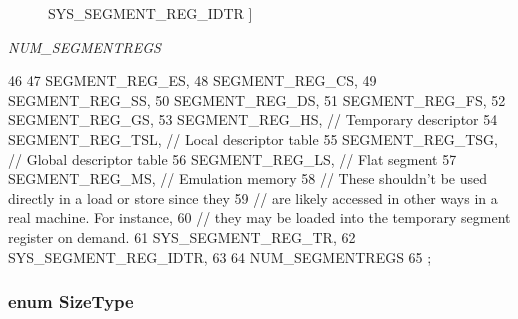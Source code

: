 \begin{Desc}
\begin{description}
{\hypertarget{namespaceX86ISA_acea32b07c2303d31296b1c07a16c4795ac023d4308917b4ec9903ea747a402436}{
SYS\_\-SEGMENT\_\-REG\_\-IDTR}
\label{namespaceX86ISA_acea32b07c2303d31296b1c07a16c4795ac023d4308917b4ec9903ea747a402436}
}]\item[{\em 
\hypertarget{namespaceX86ISA_acea32b07c2303d31296b1c07a16c4795a43afe462b4625cd9754dacd2f25c6bf6}{
NUM\_\-SEGMENTREGS}
\label{namespaceX86ISA_acea32b07c2303d31296b1c07a16c4795a43afe462b4625cd9754dacd2f25c6bf6}
}]\end{description}
\end{Desc}




\begin{DoxyCode}
46     {
47         SEGMENT_REG_ES,
48         SEGMENT_REG_CS,
49         SEGMENT_REG_SS,
50         SEGMENT_REG_DS,
51         SEGMENT_REG_FS,
52         SEGMENT_REG_GS,
53         SEGMENT_REG_HS, // Temporary descriptor
54         SEGMENT_REG_TSL, // Local descriptor table
55         SEGMENT_REG_TSG, // Global descriptor table
56         SEGMENT_REG_LS, // Flat segment
57         SEGMENT_REG_MS, // Emulation memory
58         // These shouldn't be used directly in a load or store since they
59         // are likely accessed in other ways in a real machine. For instance,
60         // they may be loaded into the temporary segment register on demand.
61         SYS_SEGMENT_REG_TR,
62         SYS_SEGMENT_REG_IDTR,
63 
64         NUM_SEGMENTREGS
65     };
\end{DoxyCode}
\hypertarget{namespaceX86ISA_a483be0a6d8ef2c72a74da3529e9d1467}{
\subsubsection[{SizeType}]{\setlength{\rightskip}{0pt plus 5cm}enum {\bf SizeType}}}
\label{namespaceX86ISA_a483be0a6d8ef2c72a74da3529e9d1467}
